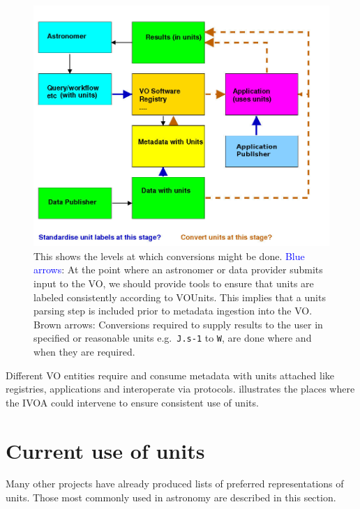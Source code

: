 \documentclass[11pt,notitlepage,onecolumn]{ivoa}
\def\eg{e.g.~}
\newcommand{\brown}{\textcolor[rgb]{0.50,0.10,0.10}}
\begin{document}
\begin{figure}[thb]
  \includegraphics[width=\textwidth]{./units2.jpg}
  \caption{This shows the levels at which conversions might be done.
\textcolor{blue}{Blue arrows}: At the point where an astronomer or
  data provider submits input to the VO, we should provide tools to
  ensure that units are labeled consistently according to VOUnits. 
  This implies that a units parsing step is included prior to metadata ingestion into the VO.
\brown{Brown arrows}: Conversions required to supply results to
  the user in specified or reasonable units \eg  \texttt{J.s-1} to \texttt{W}, are done where and when they are required.}
  \label{fig:units2}
\end{figure}

Different VO entities require and consume metadata with units attached like registries, 
applications and interoperate via protocols.  illustrates the places where the IVOA
could intervene to ensure consistent use of units.


\newpage

\appendix

\section{Current use of units}
\label{appx:current}

Many other projects have already produced lists of preferred
representations of units. Those most commonly used in
astronomy are described in this section. 
\end{document}
